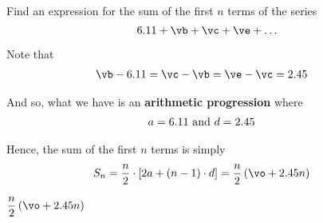 



\ADD\va\vd\vx
\ADD\vx\vd\vy
\ADD\vy\vd\vz
\ROUND[2]\vx\vb
\ROUND[2]\vy\vc
\ROUND[2]\vz\ve

\MULTIPLY{}\vm
\SUBTRACT\vm\vd\vn
\ROUND[2]\vn\vo

\question[4] Find an expression for the sum of the first $n$ terms of the series 
\[ \va + \vb + \vc + \ve + \ldots \] 

\watchout

\ifprintanswers
\fi 

\begin{solution}[\halfpage]
   Note that 
   \begin{align}
    \vb - \va &= \vc - \vb = \ve - \vc = \vd
   \end{align}

  And so, what we have is an \textbf{arithmetic progression} where 
  \begin{align}
    a &= 6.11\text{ and } d = 2.45 
  \end{align}

  Hence, the sum of the first $n$ terms is simply 
  \begin{align}
    S_n &= \dfrac{n}{2}\cdot [ 2a + (n-1)\cdot d ] = 
    \dfrac{n}{2}\left( \vo + \vd n \right) 
  \end{align}

\end{solution}

\ifprintanswers
  \begin{codex}
    $\dfrac{n}{2}\left( \vo + \vd n \right)$
  \end{codex}
\fi
